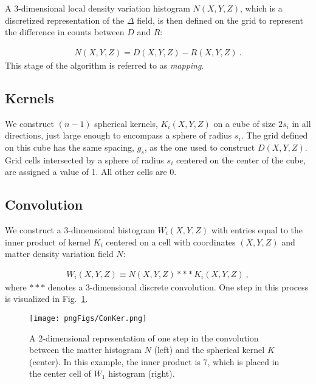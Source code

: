 \documentclass{aa}
\begin{document}
A 3-dimensional local density variation histogram $N(X,Y,Z)$, which is a discretized representation of the $\Delta$ field, is then defined on the grid to represent the difference in counts between $D$ and $R$:

\begin{align}
N(X,Y,Z) = D(X,Y,Z) - R(X,Y,Z)\ . 
\label{eq:bgsubtracted_map}
\end{align}
This stage of the algorithm is referred to as \textit {mapping}. 

\subsection{Kernels} 
\label{subsec:kernel}

We construct $(n-1)$ spherical kernels, $K_i(X,Y,Z)$ on a cube of size $2s_i$ in all directions, just large enough to encompass a sphere of radius $s_i$. The grid defined on this cube has the same spacing, $g_s$, as the one used to construct $D(X,Y,Z)$. Grid cells intersected by a sphere of radius $s_i$  centered on the center of the cube, are assigned a value of 1. All other cells are 0.

\subsection{Convolution} 
\label{subsec:conv}

We construct a 3-dimensional histogram $W_i(X,Y,Z)$ with entries  equal to the inner product of kernel $K_i$  centered on a cell  with coordinates $(X,Y,Z)$ and matter density variation field $N$: 

\begin{align}
W_i(X,Y,Z) \equiv N(X,Y,Z)\ast\ast\ast K_i(X,Y,Z) \ , 
\label{eq:countconv}
\end{align} 
%
where $\ast\ast\ast$ denotes a 3-dimensional discrete convolution. 
One step in this process is visualized in Fig.~\ref{fig:cf_method}. 

\begin{figure}
\texttt{[image: pngFigs/ConKer.png]}
\vspace{-3.1cm}
\caption{A 2-dimensional representation of one step in the convolution between  the matter histogram $N$ (left) and the spherical kernel $K$ (center).  In this example, the inner product is 7, which is placed in the center cell of $W_1$ histogram (right).}
\label{fig:cf_method}
\end{figure}
\end{document}
